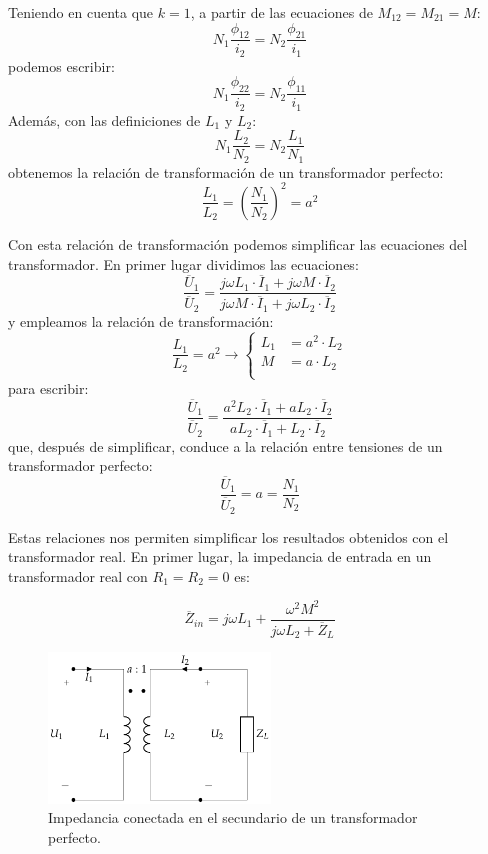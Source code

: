 Teniendo en cuenta que $k = 1$, a partir de las ecuaciones de
$M_{12} = M_{21} = M$:
\[
  N_1 \frac{\phi_{12}}{i_2} = N_2 \frac{\phi_{21}}{i_1}
\]
podemos escribir:
\[
  N_1 \frac{\phi_{22}}{i_2} = N_2 \frac{\phi_{11}}{i_1}
\]
Además, con las definiciones de $L_1$ y $L_2$:
\[
  N_1 \frac{L_2}{N_2} = N_2 \frac{L_1}{N_1}
\]
obtenemos la relación de transformación de un transformador perfecto:
\begin{equation}
  \label{eq:trafo-perfecto-a}
  \boxed{\frac{L_1}{L_2} = \left(\frac{N_1}{N_2}\right)^2 = a^2}
\end{equation}


Con esta relación de transformación podemos simplificar las ecuaciones
del transformador. En primer lugar dividimos las ecuaciones:
\[
  \frac{\overline{U}_1}{\overline{U}_2} = \frac{j \omega L_1 \cdot
    \overline{I}_1 + j \omega M \cdot \overline{I}_2}{j \omega M \cdot
    \overline{I}_1 + j \omega L_2 \cdot \overline{I}_2}
\]
y empleamos la relación de transformación:
\[
  \frac{L_1}{L_2} = a^2 \rightarrow \left\{
    \begin{array}{ll}
      L_1 &= a^2 \cdot L_2\\
      M &= a \cdot L_2\\
    \end{array}\right.
\]
para escribir:
\[
  \frac{\overline{U}_1}{\overline{U}_2} = \frac{a^2 L_2 \cdot
    \overline{I}_1 + a L_2 \cdot \overline{I}_2}{a L_2 \cdot
    \overline{I}_1 + L_2 \cdot \overline{I}_2}
\]
que, después de simplificar, conduce a la relación entre tensiones de
un transformador perfecto:
\begin{equation}
  \label{eq:trafo-perfecto-tensiones}
  \boxed{\frac{\overline{U}_1}{\overline{U}_2} = a = \frac{N_1}{N_2}}
\end{equation}

Estas relaciones nos permiten simplificar los resultados obtenidos con
el transformador real. En primer lugar, la impedancia de entrada en un
transformador real con $R_1 = R_2 = 0$ es:

\[
  \overline{Z}_{in} = j\omega L_1 + \frac{\omega^2 M^2}{j\omega L_2 +
    \overline{Z}_L}
\]

\begin{figure}
  \centering
  \includegraphics[height=4cm]{../figs/TrafoPerfecto_ImpedanciaSecundario.pdf}
  \caption{Impedancia conectada en el secundario de un transformador perfecto.}
  \label{fig:trafo-perfecto-impedancia-secundario}
\end{figure}

